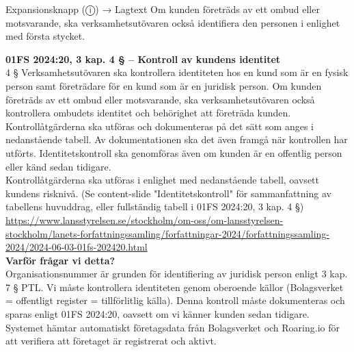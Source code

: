\documentclass[10pt]{beamer}
\begin{document}
\begin{frame}[label=riskfragor-steg1]
\begin{alertblock}{Expansionsknapp (ⓘ) → Lagtext}
    \tiny Om kunden företräds av ett ombud eller motsvarande, ska verksamhetsutövaren
     också identifiera den personen i enlighet med första stycket.
    \vspace{0.1cm}
    
    \tiny \textbf{01FS 2024:20, 3 kap. 4 § – Kontroll av kundens identitet}\\
    \tiny 4 § Verksamhetsutövaren ska kontrollera identiteten hos en kund som är en fysisk 
    person samt företrädare för en kund som är en juridisk person. Om kunden företräds av ett 
    ombud eller motsvarande, ska verksamhetsutövaren också kontrollera ombudets identitet och 
    behörighet att företräda kunden.\\[0.1cm]

    \tiny Kontrollåtgärderna ska utföras och dokumenteras på det sätt som anges i nedanstående tabell.
    Av dokumentationen ska det även framgå när kontrollen har utförts. 
    Identitetskontroll ska genomföras även om kunden är en offentlig person eller känd sedan tidigare.\\[0.1cm]

    \tiny Kontrollåtgärderna ska utföras i enlighet med nedanstående tabell, oavsett kundens risknivå.
    (Se content-slide "Identitetskontroll" för sammanfattning av tabellens huvuddrag, eller 
    fullständig tabell i 01FS 2024:20, 3 kap. 4 §)\\
    \tiny \url{https://www.lansstyrelsen.se/stockholm/om-oss/om-lansstyrelsen-stockholm/lanets-forfattningssamling/forfattningar-2024/forfattningssamling-2024/2024-06-03-01fs-202420.html}\\[0.1cm]
    
    \tiny \textbf{Varför frågar vi detta?}\\
    \tiny Organisationsnummer är grunden för identifiering av juridisk person enligt 3 kap. 7 § PTL. 
    Vi måste kontrollera identiteten genom oberoende källor (Bolagsverket = offentligt register = 
    tillförlitlig källa). Denna kontroll måste dokumenteras och sparas enligt 01FS 2024:20, 
    oavsett om vi känner kunden sedan tidigare. Systemet hämtar automatiskt företagsdata från 
    Bolagsverket och Roaring.io för att verifiera att företaget är registrerat och aktivt.
  \end{alertblock}

  \vspace{0.2cm}


\end{frame}
\end{document}
